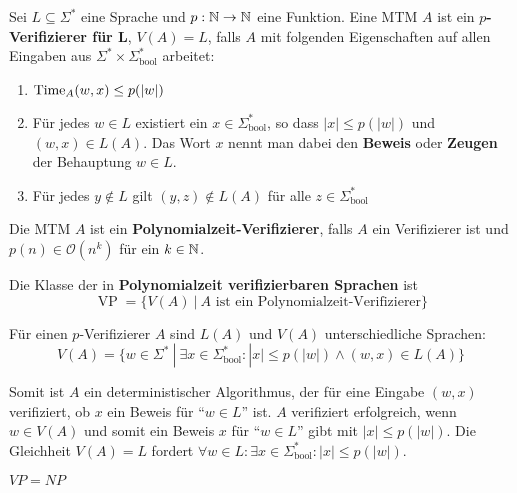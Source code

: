\begin{definition}
Sei \(L \subseteq \Sigma^*\) eine Sprache und \(p: \mathbb{N} \to \mathbb{N}\) eine Funktion. Eine MTM \(A\) ist ein \textbf{\(p\)-Verifizierer für L}, \(V(A) = L\), falls \(A\) mit folgenden Eigenschaften auf allen Eingaben aus \(\Sigma^* \times \Sigma_\text{bool}^*\) arbeitet:
\begin{enumerate}
  \item \(\operatorname{Time}_A(w, x) \leq p(|w|)\)
  \item Für jedes \(w \in L\) existiert ein \(x \in \Sigma_\text{bool}^*\), so dass \(|x| \leq p(|w|)\) und \((w, x) \in L(A)\). Das Wort \(x\) nennt man dabei den \textbf{Beweis} oder \textbf{Zeugen} der Behauptung \(w \in L\).
  \item Für jedes \(y \notin L\) gilt \((y, z) \notin L(A)\) für alle \(z \in \Sigma_\text{bool}^*\)\\
\end{enumerate}
\end{definition}

\begin{definition}
Die MTM \(A\) ist ein \textbf{Polynomialzeit-Verifizierer}, falls \(A\) ein Verifizierer ist und \(p(n) \in \mathcal{O}(n^k)\) für ein \(k \in \mathbb{N}\).\\
\end{definition}

\begin{definition}
Die Klasse der in \textbf{Polynomialzeit verifizierbaren Sprachen} ist
\[
\operatorname{VP} = \{ V(A) \ |\ A \text{ ist ein Polynomialzeit-Verifizierer}\}
\]
\end{definition}

\begin{remark}
Für einen \(p\)-Verifizierer \(A\) sind \(L(A)\) und \(V(A)\) unterschiedliche Sprachen:
\[
V(A) = \{ w \in \Sigma^* \ |\ \exists x \in \Sigma_\text{bool}^*: |x| \leq p(|w|) \land (w, x) \in L(A)\}
\]

Somit ist \(A\) ein deterministischer Algorithmus, der für eine Eingabe \((w, x)\) verifiziert, ob \(x\) ein Beweis für ``\(w \in L\)'' ist. \(A\) verifiziert erfolgreich, wenn \(w \in V(A)\) und somit ein Beweis \(x\) für ``\(w \in L\)'' gibt mit \(|x| \leq p(|w|)\).  Die Gleichheit \(V(A) = L\) fordert \(\forall w \in L: \exists x \in \Sigma_\text{bool}^*: |x| \leq p(|w|)\).\\
\end{remark}

\begin{satz}
\(VP = NP\)\\
\end{satz}

